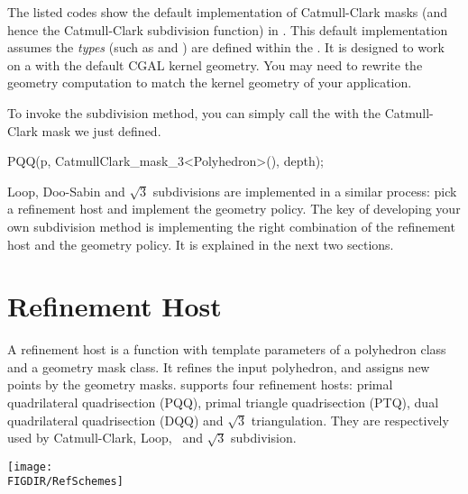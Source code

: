 The listed codes show the default implementation of Catmull-Clark 
masks (and hence the Catmull-Clark subdivision function) 
in .
This default implementation assumes the \emph{types} 
(such as  and ) are defined 
within the . It is designed
to work on a  with the default CGAL 
kernel geometry. You may need to rewrite the geometry computation
to match the kernel geometry of your application.

To invoke the subdivision method, you can 
simply call the  with the Catmull-Clark mask
we just defined.

\begin{ccExampleCode}
PQQ(p, CatmullClark_mask_3<Polyhedron>(), depth);
\end{ccExampleCode}


Loop, Doo-Sabin and $\sqrt{3}$ subdivisions are implemented 
in a similar process: pick a refinement host and implement 
the geometry policy. The key of developing your own 
subdivision method is implementing the right combination of 
the refinement host and the geometry policy. It is 
explained in the next two sections.

\section{Refinement Host}
\label{secRefHost}
A refinement host is a function with template parameters of 
a polyhedron class and a geometry mask class. It refines
the input polyhedron, and assigns new points by the geometry masks.
 supports four refinement hosts:
primal quadrilateral quadrisection (PQQ), 
primal triangle quadrisection (PTQ), dual quadrilateral 
quadrisection (DQQ) and $\sqrt{3}$ triangulation.
They are respectively used by Catmull-Clark, Loop, \DS\ and $\sqrt{3}$ 
subdivision. 

\begin{ccTexOnly}
  \begin{center}
    \parbox{0.6\textwidth}{%
      \texttt{[image: \\FIGDIR/RefSchemes]}%
    }\\ \vspace{0.5cm}
  \end{center}
\end{ccTexOnly}

